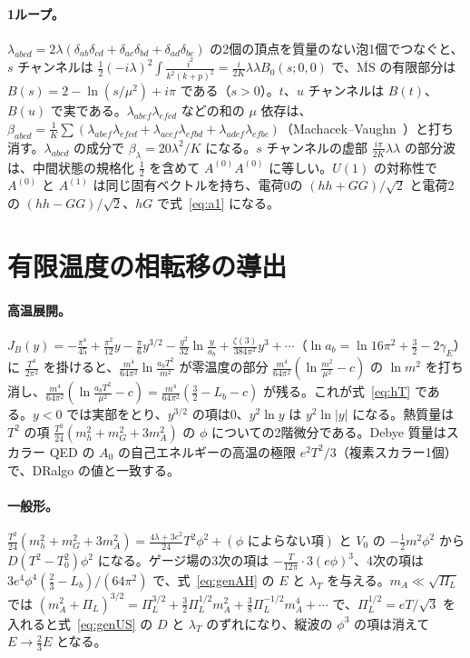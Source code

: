 \documentclass[a4paper,10pt]{ltjsarticle}
\newcommand{\MSbar}{\overline{\mathrm{MS}}}
\begin{document}
\paragraph{1ループ。}$\lambda_{abcd}=2\lambda(\delta_{ab}\delta_{cd}+\delta_{ac}\delta_{bd}+\delta_{ad}\delta_{bc})$ の2個の頂点を質量のない泡1個でつなぐと、$s$ チャンネルは $\frac12(-i\lambda)^2\int\frac{i^2}{k^2(k+p)^2}=\frac{i}{2K}\lambda\lambda B_0(s;0,0)$ で、$\MSbar$ の有限部分は $B(s)=2-\ln(s/\mu^2)+i\pi$ である（$s>0$）。$t$、$u$ チャンネルは $B(t)$、$B(u)$ で実である。$\lambda_{abef}\lambda_{efcd}$ などの和の $\mu$ 依存は、$\beta_{abcd}=\frac1K\sum(\lambda_{abef}\lambda_{efcd}+\lambda_{acef}\lambda_{efbd}+\lambda_{adef}\lambda_{efbc})$（Machacek--Vaughn~\cite{mv3}）と打ち消す。$\lambda_{abcd}$ の成分で $\beta_\lambda=20\lambda^2/K$ になる。$s$ チャンネルの虚部 $\frac{i\pi}{2K}\lambda\lambda$ の部分波は、中間状態の規格化 $\frac12$ を含めて $A^{(0)}A^{(0)}$ に等しい。$U(1)$ の対称性で $A^{(0)}$ と $A^{(1)}$ は同じ固有ベクトルを持ち、電荷0の $(hh+GG)/\sqrt2$ と電荷2の $(hh-GG)/\sqrt2$、$hG$ で式~\eqref{eq:a1} になる。

\section{有限温度の相転移の導出}\label{app:thermal}

\paragraph{高温展開。}$J_B(y)=-\frac{\pi^4}{45}+\frac{\pi^2}{12}y-\frac\pi6y^{3/2}-\frac{y^2}{32}\ln\frac y{a_b}+\frac{\zeta(3)}{384\pi^2}y^3+\cdots$（$\ln a_b=\ln16\pi^2+\frac32-2\gamma_E$）に $\frac{T^4}{2\pi^2}$ を掛けると、$\frac{m^4}{64\pi^2}\ln\frac{a_bT^2}{m^2}$ が零温度の部分 $\frac{m^4}{64\pi^2}(\ln\frac{m^2}{\mu^2}-c)$ の $\ln m^2$ を打ち消し、$\frac{m^4}{64\pi^2}(\ln\frac{a_bT^2}{\mu^2}-c)=\frac{m^4}{64\pi^2}(\frac32-L_b-c)$ が残る。これが式~\eqref{eq:hT} である。$y<0$ では実部をとり、$y^{3/2}$ の項は0、$y^2\ln y$ は $y^2\ln|y|$ になる。熱質量は $T^2$ の項 $\frac{T^2}{24}(m_h^2+m_G^2+3m_A^2)$ の $\phi$ についての2階微分である。Debye 質量はスカラー QED の $A_0$ の自己エネルギーの高温の極限 $e^2T^2/3$（複素スカラー1個）で、DRalgo の値と一致する。

\paragraph{一般形。}$\frac{T^2}{24}(m_h^2+m_G^2+3m_A^2)=\frac{4\lambda+3e^2}{24}T^2\phi^2+(\phi\text{ によらない項})$ と $V_0$ の $-\frac12m^2\phi^2$ から $D(T^2-T_0^2)\phi^2$ になる。ゲージ場の3次の項は $-\frac T{12\pi}\cdot3(e\phi)^3$、4次の項は $3e^4\phi^4(\frac23-L_b)/(64\pi^2)$ で、式~\eqref{eq:genAH} の $E$ と $\lambda_T$ を与える。$m_A\ll\sqrt{\Pi_L}$ では $(m_A^2+\Pi_L)^{3/2}=\Pi_L^{3/2}+\frac32\Pi_L^{1/2}m_A^2+\frac38\Pi_L^{-1/2}m_A^4+\cdots$ で、$\Pi_L^{1/2}=eT/\sqrt3$ を入れると式~\eqref{eq:genUS} の $D$ と $\lambda_T$ のずれになり、縦波の $\phi^3$ の項は消えて $E\to\frac23E$ となる。
\end{document}
